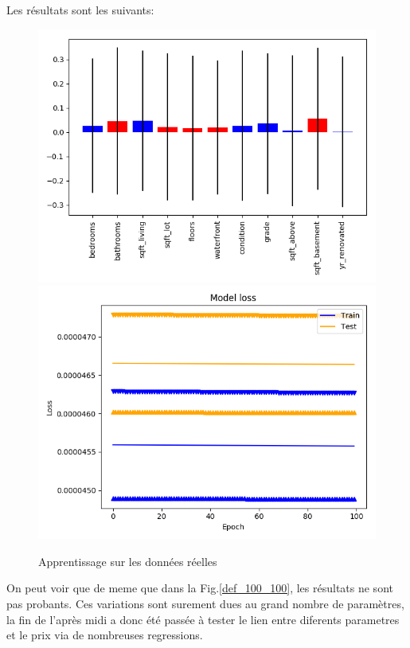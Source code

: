 Les résultats sont les suivants:
\begin{figure}[H]
    \center
    \includegraphics[height=\petit]{sources/data/Obj2/real/graphs/remove1_100_100.png}
    \includegraphics[height=\petit]{sources/data/Obj2/real/graphs/remove1_100_100_learn.png}
	\caption{Apprentissage sur les données réelles}
	\label{r1_100_100}
\end{figure}
On peut voir que de meme que dans la Fig.\ref{def_100_100}, les résultats ne sont pas probants.
Ces variations sont surement dues au grand nombre de paramètres,
la fin de l'après midi a donc été passée à tester le lien entre diferents parametres et le prix via de nombreuses regressions.
